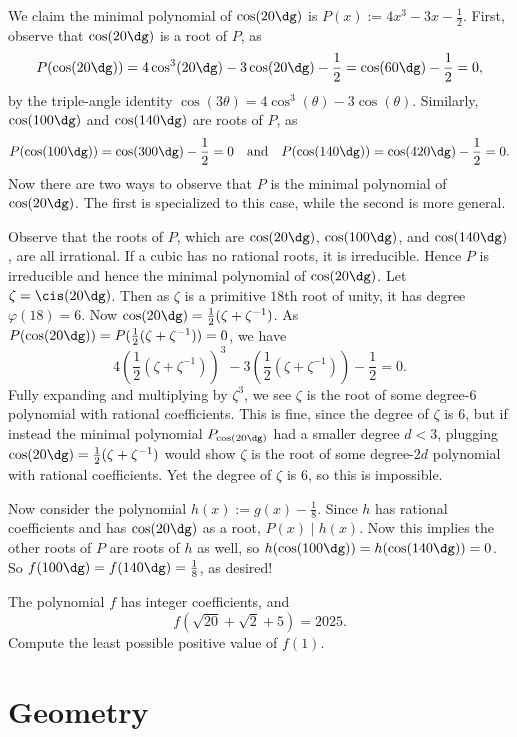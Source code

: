 \documentclass[11pt]{scrartcl}
\begin{document}
We claim the minimal polynomial of $\cos(20\dg)$ is $P(x) := 4x^3 - 3x - \frac12$. First, observe that $\cos(20\dg)$ is a root of $P$, as
\[P(\cos(20\dg)) = 4\cos^3(20\dg) - 3\cos(20\dg) - \frac12 = \cos(60\dg) - \frac12 = 0,\]
by the triple-angle identity $\cos(3\theta) = 4\cos^3(\theta) - 3\cos(\theta)$. Similarly, $\cos(100\dg)$ and $\cos(140\dg)$ are roots of $P$, as
\[P(\cos(100\dg)) = \cos(300\dg) - \frac12 = 0 \quad \text{and} \quad P(\cos(140\dg)) = \cos(420\dg) - \frac12 = 0.\]
Now there are two ways to observe that $P$ is the minimal polynomial of $\cos(20\dg)$. The first is specialized to this case, while the second is more general.
\begin{itemize}
	\ii Observe that the roots of $P$, which are $\cos(20\dg)$, $\cos(100\dg)$, and $\cos(140\dg)$, are all irrational. If a cubic has no rational roots, it is irreducible. Hence $P$ is irreducible and hence the minimal polynomial of $\cos(20\dg)$.
	\ii Let $\zeta = \cis(20\dg)$. Then as $\zeta$ is a primitive $18$th root of unity, it has degree $\varphi(18) = 6$. Now $\cos(20\dg) = \frac12(\zeta + \zeta^{-1})$. As $P(\cos(20\dg)) = P(\frac12(\zeta + \zeta^{-1})) = 0$, we have
	\[4 \left( \frac12(\zeta + \zeta^{-1}) \right)^3 - 3 \left( \frac12(\zeta + \zeta^{-1}) \right) - \frac12 = 0.\]
	Fully expanding and multiplying by $\zeta^3$, we see $\zeta$ is the root of some degree-$6$ polynomial with rational coefficients. This is fine, since the degree of $\zeta$ is $6$, but if instead the minimal polynomial $P_{\cos(20\dg)}$ had a smaller degree $d < 3$, plugging $\cos(20\dg) = \frac12(\zeta + \zeta^{-1})$ would show $\zeta$ is the root of some degree-$2d$ polynomial with rational coefficients. Yet the degree of $\zeta$ is $6$, so this is impossible.
\end{itemize}

Now consider the polynomial $h(x) := g(x) - \frac18$. Since $h$ has rational coefficients and has $\cos(20\dg)$ as a root, $P(x) \mid h(x)$. Now this implies the other roots of $P$ are roots of $h$ as well, so $h(\cos(100\dg)) = h(\cos(140\dg)) = 0$. So $f(100\dg) = f(140\dg) = \frac18$, as desired!

\begin{exercise}[ARML 2025/I8]
	The polynomial $f$ has integer coefficients, and
	\[f(\sqrt{20} + \sqrt2 + 5) = 2025.\]
	Compute the least possible positive value of $f(1)$.
\end{exercise}

\section{Geometry}
\end{document}
